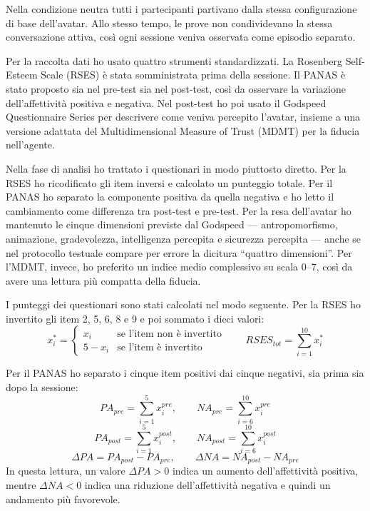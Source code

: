 Nella condizione neutra tutti i partecipanti partivano dalla stessa configurazione di base dell'avatar. Allo stesso tempo, le prove non condividevano la stessa conversazione attiva, così ogni sessione veniva osservata come episodio separato.

Per la raccolta dati ho usato quattro strumenti standardizzati. La Rosenberg Self-Esteem Scale (RSES) \cite{Rosenberg1965} è stata somministrata prima della sessione. Il PANAS \cite{Watson1988PANAS} è stato proposto sia nel pre-test sia nel post-test, così da osservare la variazione dell'affettività positiva e negativa. Nel post-test ho poi usato il Godspeed Questionnaire Series \cite{Bartneck2009Godspeed} per descrivere come veniva percepito l'avatar, insieme a una versione adattata del Multidimensional Measure of Trust (MDMT) \cite{MalleUllman2021MDMT} per la fiducia nell'agente.

Nella fase di analisi ho trattato i questionari in modo piuttosto diretto. Per la RSES ho ricodificato gli item inversi e calcolato un punteggio totale. Per il PANAS ho separato la componente positiva da quella negativa e ho letto il cambiamento come differenza tra post-test e pre-test. Per la resa dell'avatar ho mantenuto le cinque dimensioni previste dal Godspeed --- antropomorfismo, animazione, gradevolezza, intelligenza percepita e sicurezza percepita --- anche se nel protocollo testuale compare per errore la dicitura ``quattro dimensioni''. Per l'MDMT, invece, ho preferito un indice medio complessivo su scala 0--7, così da avere una lettura più compatta della fiducia.

I punteggi dei questionari sono stati calcolati nel modo seguente. Per la RSES ho invertito gli item 2, 5, 6, 8 e 9 e poi sommato i dieci valori:
\[
x_i^*=
\begin{cases}
x_i & \text{se l'item non è invertito}\\
5-x_i & \text{se l'item è invertito}
\end{cases}
\qquad
RSES_{tot}=\sum_{i=1}^{10}x_i^*
\]

Per il PANAS ho separato i cinque item positivi dai cinque negativi, sia prima sia dopo la sessione:
\[
PA_{pre}=\sum_{i=1}^{5}x_i^{pre}, \qquad NA_{pre}=\sum_{i=6}^{10}x_i^{pre}
\]
\[
PA_{post}=\sum_{i=1}^{5}x_i^{post}, \qquad NA_{post}=\sum_{i=6}^{10}x_i^{post}
\]
\[
\Delta PA = PA_{post}-PA_{pre}, \qquad \Delta NA = NA_{post}-NA_{pre}
\]
In questa lettura, un valore \(\Delta PA > 0\) indica un aumento dell'affettività positiva, mentre \(\Delta NA < 0\) indica una riduzione dell'affettività negativa e quindi un andamento più favorevole.

